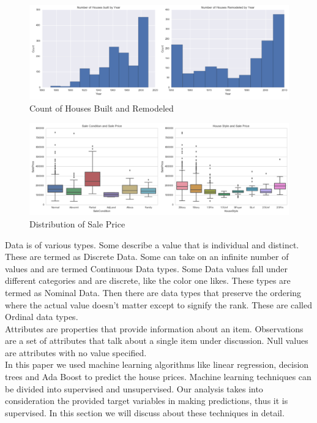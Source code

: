 \documentclass[fleqn,10pt]{SelfArx} %
\begin{document}
	\begin{figure}[ht]\centering %
		\includegraphics[width=\linewidth]{year}
		\caption{Count of Houses Built and Remodeled}
		\label{fig:year}
	\end{figure}
	\begin{figure}[ht]\centering %
		\includegraphics[width=\linewidth]{SalePrice}
		\caption{Distribution of Sale Price}
		\label{fig:SalePrice}
	\end{figure}

	Data is of various types. Some describe a value that is individual and distinct. These are termed as Discrete Data. Some can take on an infinite number of values and are termed Continuous Data types.  Some Data values fall under different categories and are discrete, like the color one likes. These types are termed as Nominal Data. Then there are data types that preserve the ordering where the actual value doesn't matter except to signify the rank. These are called Ordinal data types. \\
	
	Attributes are properties that provide information about an item. Observations are a set of attributes that talk about a single item under discussion. Null values are attributes with no value specified.\\
	
	In this paper we used machine learning algorithms like linear regression, decision trees and Ada Boost to predict the house prices. Machine learning techniques can be divided into supervised and unsupervised. Our analysis takes into consideration the provided target variables in making predictions, thus it is supervised. In this section we will discuss about these techniques in detail.
	
\end{document}
